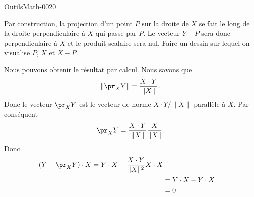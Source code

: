 
\begin{corrige}{OutilsMath-0020}

	Par construction, la projection d'un point $P$ sur la droite de $X$ se fait le long de la droite perpendiculaire à $X$ qui passe par $P$. Le vecteur $Y-P$ sera donc perpendiculaire à $X$ et le produit scalaire sera nul. Faire un dessin sur lequel on visualise $P$, $X$ et $X-P$.

	Nous pouvons obtenir le résultat par calcul. Nous savons que
	\begin{equation}
		\| \pr_XY \|=\frac{ X\cdot Y }{ \| X \| }.
	\end{equation}
	Donc le vecteur $\pr_XY$ est le vecteur de norme $X\cdot Y/\| X \|$ parallèle à $X$. Par conséquent
	\begin{equation}
		\pr_XY=\frac{ X\cdot Y }{ \| X \| }\frac{ X }{ \| X \| }.
	\end{equation}
	Donc
	\begin{equation}
		\begin{aligned}[]
			(Y-\pr_XY)\cdot X=Y\cdot X-\frac{ X\cdot Y }{ \| X \|^2 }X\cdot X\\
			&=Y\cdot X-Y\cdot X\\
			&=0
		\end{aligned}
	\end{equation}

\end{corrige}
